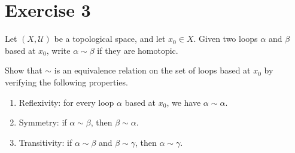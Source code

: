 \documentclass[12pt]{article}
\begin{document}
\newpage

\section*{Exercise 3}

Let $(X,\mathcal{U})$ be a topological space,
and let $x_0\in X$.
Given two loops $\alpha$ and $\beta$ based at $x_0$,
write $\alpha\sim\beta$ if they are homotopic.

Show that $\sim$ is an equivalence relation on the
set of loops based at $x_0$ by verifying the
following properties.

\begin{enumerate}
\item[(i)] Reflexivity: for every loop $\alpha$
based at $x_0$, we have $\alpha\sim\alpha$.

\item[(ii)] Symmetry: if $\alpha\sim\beta$,
then $\beta\sim\alpha$.

\item[(iii)] Transitivity: if $\alpha\sim\beta$
and $\beta\sim\gamma$, then $\alpha\sim\gamma$.
\end{enumerate}
\end{document}
